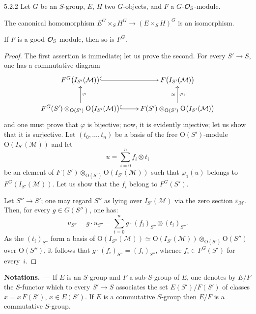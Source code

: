 \begin{lemma}{5.2.2}
\label{II.5.2.2}
Let \(G\) be an \(S\)-group, \(E\), \(H\) two \(G\)-objects, and \(F\) a
\(G\)-\(\mathcal{O}_S\)-module.
\begin{enumeratei}
\item The canonical homomorphism
\(E^G\times_S H^G\to(E\times_S H)^G\) is an isomorphism.
\item If \(F\) is a good \(\mathcal{O}_S\)-module, then so is \(F^G\).
\end{enumeratei}
\end{lemma}

\begin{proof}
\renewcommand{\qedsymbol}{}
{\renewcommand{\thefootnote}{(94)}}
The first assertion is immediate; let us prove the second. For every
\(S'\to S\), one has a commutative diagram
\[
\xymatrix{
F^G\bigl(I_{S'}(\mathcal{M})\bigr) \ar@{^{(}->}[r]
  & F\bigl(I_{S'}(\mathcal{M})\bigr) \\
F^G(S')\otimes_{\mathrm{O}(S')}\mathrm{O}\bigl(I_{S'}(\mathcal{M})\bigr)
  \ar@{^{(}->}[r] \ar[u]_{\varphi}
  & F(S')\otimes_{\mathrm{O}(S')}\mathrm{O}\bigl(I_{S'}(\mathcal{M})\bigr)
  \ar[u]^{\simeq}_{\varphi_1}
}
\]
and one must prove that \(\varphi\) is bijective; now, it is evidently
injective; let us show that it is surjective. Let \((t_0,\ldots,t_n)\) be a
basis of the free \(\mathrm{O}(S')\)-module
\(\mathrm{O}(I_{S'}(\mathcal{M}))\) and let
\[
u=\sum_{i=0}^{n}f_i\otimes t_i
\]
be an element of
\(F(S')\otimes_{\mathrm{O}(S')}\mathrm{O}(I_{S'}(\mathcal{M}))\) such that
\(\varphi_1(u)\) belongs to \(F^G(I_{S'}(\mathcal{M}))\). Let us show that
the \(f_i\) belong to \(F^G(S')\).

Let \(S''\to S'\); one may regard \(S''\) as lying over
\(I_{S'}(\mathcal{M})\) via the zero section \(\varepsilon_{\mathcal{M}}\).
Then, for every \(g\in G(S'')\), one has:
\[
u_{S''}=g\cdot u_{S''}
=\sum_{i=0}^{n}g\cdot(f_i)_{S''}\otimes(t_i)_{S''}.
\]
As the \((t_i)_{S''}\) form a basis of
\(\mathrm{O}(I_{S''}(\mathcal{M}))
\simeq\mathrm{O}(I_{S'}(\mathcal{M}))\otimes_{\mathrm{O}(S')}\mathrm{O}(S'')\)
over \(\mathrm{O}(S'')\), it follows that
\(g\cdot(f_i)_{S''}=(f_i)_{S''}\), whence \(f_i\in F^G(S')\) for every~\(i\).
\end{proof}

\par{}%
\noindent\textbf{Notations.}\ ---
{\renewcommand{\thefootnote}{(95)}}
If \(E\) is an \(S\)-group and \(F\) a sub-\(S\)-group of \(E\), one denotes
by \(E/F\) the \(S\)-functor which to every \(S'\to S\) associates the set
\(E(S')/F(S')\) of classes \(x=x\,F(S')\), \(x\in E(S')\). If \(E\) is a
commutative \(S\)-group then \(E/F\) is a commutative \(S\)-group.

